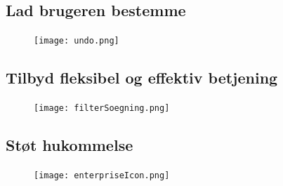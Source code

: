 \documentclass[a4paper,10pt]{article}
\begin{document}
\subsection{ Lad brugeren bestemme}%
\begin{figure}[H]
    \texttt{[image: undo.png]}
\end{figure}

\subsection{Tilbyd fleksibel og effektiv betjening}%
\begin{figure}[H]
    \texttt{[image: filterSoegning.png]}
\end{figure}

\subsection{Støt hukommelse}%

\begin{figure}[H]
    \centering
    \texttt{[image: enterpriseIcon.png]}
\end{figure}


\section{ }
\end{document}
